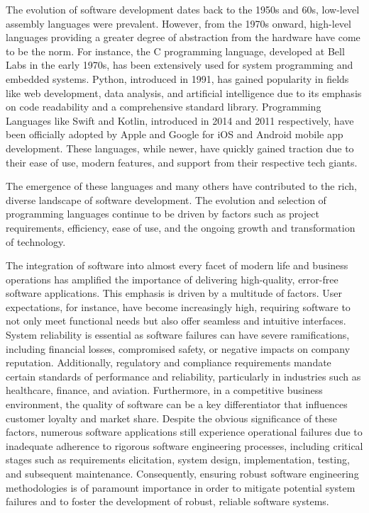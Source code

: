 The evolution of software development dates back to the 1950s and 60s, low-level assembly
languages were prevalent\cite{lehman2002software}. However, from the 1970s onward,
high-level languages providing a greater degree of abstraction from the hardware\cite{WhatisHa66:online}
have come to be the norm. For instance, the C programming language, developed at Bell Labs in the
early 1970s, has been extensively used for system programming and embedded systems\cite{kernighan2002c}.
Python, introduced in 1991, has gained popularity in fields like web development,
data analysis, and artificial intelligence due to its emphasis on code readability and a
comprehensive standard library\cite{van2007python}. Programming Languages like
Swift\cite{rebouccas2016empirical} and Kotlin\cite{samuel2017programming},
introduced in 2014 and 2011 respectively, have been officially adopted by Apple and Google
for iOS\cite{WhatIsSw25:online} and Android mobile app development\cite{WhatIsKo37:online}.
These languages, while newer, have quickly gained traction due to their ease of use,
modern features, and support from their respective tech giants.

The emergence of these languages and many others have contributed to the rich,
diverse landscape of software development. The evolution and selection of programming
languages continue to be driven by factors such as project requirements,
efficiency, ease of use, and the ongoing growth and transformation of technology\cite{goosen2008brief}.

The integration of software into almost every facet of modern life and
business operations has amplified the importance of delivering high-quality,
error-free software applications\cite{kahn2002information}. This emphasis is
driven by a multitude of factors. User expectations, for instance, have become
increasingly high, requiring software to not only meet functional needs but
also offer seamless and intuitive interfaces\cite{ryker1997determinants}.
System reliability\cite{pham2007system} is essential as software failures can have severe
ramifications, including financial losses, compromised safety, or
negative impacts on company reputation. Additionally, regulatory and compliance requirements
mandate certain standards of performance and reliability, particularly in industries such as
healthcare, finance, and aviation\cite{mishra2022cybersecurity}. Furthermore, in a
competitive business environment, the quality of software can be a key differentiator
that influences customer loyalty and market share\cite{rust1993customer}. Despite the obvious
significance of these factors, numerous software applications still experience
operational failures due to inadequate adherence to rigorous software
engineering processes, including critical stages such as
requirements elicitation, system design, implementation, testing, and subsequent
maintenance. Consequently, ensuring robust software engineering methodologies is
of paramount importance in order to mitigate potential system failures and to
foster the development of robust, reliable software systems.

